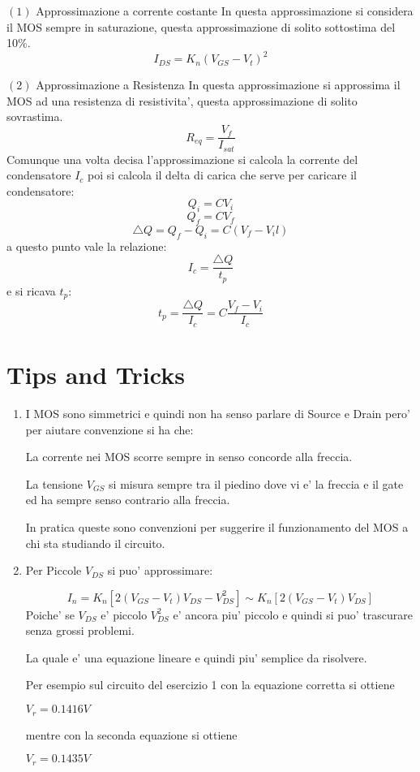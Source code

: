 \documentclass[\main/main.tex]{subfiles}
\begin{document}
$(1)$ Approssimazione a corrente costante
In questa approssimazione si considera il MOS sempre in saturazione, questa approssimazione di solito sottostima del 10\%.
\[ I_{DS} = K_n \left( V_{GS} - V_t \right)^2\]

$(2)$ Approssimazione a Resistenza
In questa approssimazione si approssima il MOS ad una resistenza di resistivita', questa approssimazione di solito sovrastima.
\[R_{eq} = \frac{V_f}{I_{sat}} \]
Comunque una volta decisa l'approssimazione si calcola la corrente del condensatore $I_c$ poi si calcola il delta di carica che serve per caricare il condensatore:
\[Q_i = C V_i\]
\[Q_f = C V_f\]
\[\bigtriangleup Q = Q_f - Q_i = C \left( V_f - V_il\right) \]
a questo punto vale la relazione:
\[I_c = \frac{\bigtriangleup Q}{t_p}\]
e si ricava $t_p$:
\[t_p = \frac{\bigtriangleup Q}{I_c} = C \frac{V_f - V_i}{I_c}\]



\section{Tips and Tricks}
\begin{enumerate}
\item I MOS sono simmetrici e quindi non ha senso parlare di Source e Drain pero' per aiutare convenzione si ha che:

La corrente nei MOS scorre sempre in senso concorde alla freccia.

La tensione $V_{GS}$ si misura sempre tra il piedino dove vi e' la freccia e il gate ed ha sempre senso contrario alla freccia.

In pratica queste sono convenzioni per suggerire il funzionamento del MOS a chi sta studiando il circuito.

\item Per Piccole $V_{DS}$ si puo' approssimare:

\[I_n = K_n \left[ 2 \left( V_{GS} -V_t \right)V_{DS} - V_{DS}^2 \right] \sim K_n \left[ 2 \left( V_{GS} -V_t \right)V_{DS} \right]\]
Poiche' se $V_{DS}$ e' piccolo $V_{DS}^2$ e' ancora piu' piccolo e quindi si puo' trascurare senza grossi problemi.

La quale e' una equazione lineare e quindi piu' semplice da risolvere.

Per esempio sul circuito del esercizio 1 con la equazione corretta si ottiene 

$V_r = 0.1416V$

mentre con la seconda equazione si ottiene

$V_r = 0.1435V$
\end{enumerate}
\end{document}
